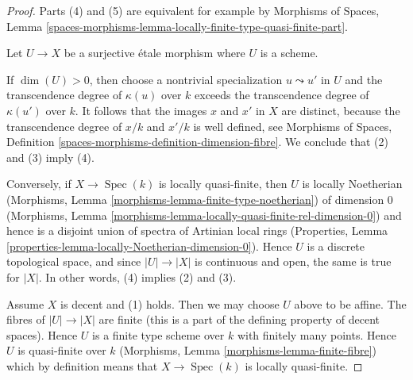\documentclass{stacks-project}
\theoremstyle{plain}
\theoremstyle{definition}
\theoremstyle{remark}
\numberwithin{equation}{subsection}
\def\Spec{\mathop{\mathrm{Spec}}}
\begin{document}
\begin{proof}
Parts (4) and (5) are equivalent for example by
Morphisms of Spaces, Lemma
\ref{spaces-morphisms-lemma-locally-finite-type-quasi-finite-part}.

\medskip\noindent
Let $U \to X$ be a surjective \'etale morphism where $U$ is a scheme.

\medskip\noindent
If $\dim(U) > 0$, then choose a nontrivial specialization
$u \leadsto u'$ in $U$ and the transcendence degree of $\kappa(u)$
over $k$ exceeds the transcendence degree of $\kappa(u')$ over $k$.
It follows that the images $x$ and $x'$ in $X$ are distinct, because
the transcendence degree of $x/k$ and $x'/k$ is well defined, see
Morphisms of Spaces, Definition
\ref{spaces-morphisms-definition-dimension-fibre}.
We conclude that (2) and (3) imply (4).

\medskip\noindent
Conversely, if $X \to \Spec(k)$ is locally quasi-finite, then $U$ is
locally Noetherian
(Morphisms, Lemma \ref{morphisms-lemma-finite-type-noetherian})
of dimension $0$
(Morphisms, Lemma \ref{morphisms-lemma-locally-quasi-finite-rel-dimension-0})
and hence is a disjoint union of spectra of Artinian local rings
(Properties, Lemma \ref{properties-lemma-locally-Noetherian-dimension-0}).
Hence $U$ is a discrete topological space, and since $|U| \to |X|$
is continuous and open, the same is true for $|X|$.
In other words, (4) implies (2) and (3).

\medskip\noindent
Assume $X$ is decent and (1) holds. Then we may choose $U$ above to
be affine. The fibres of $|U| \to |X|$ are finite (this is a part of the
defining property of decent spaces). Hence $U$ is a finite type scheme
over $k$ with finitely many points. Hence $U$ is quasi-finite over $k$
(Morphisms, Lemma \ref{morphisms-lemma-finite-fibre})
which by definition means that $X \to \Spec(k)$ is locally quasi-finite.
\end{proof}
\end{document}
